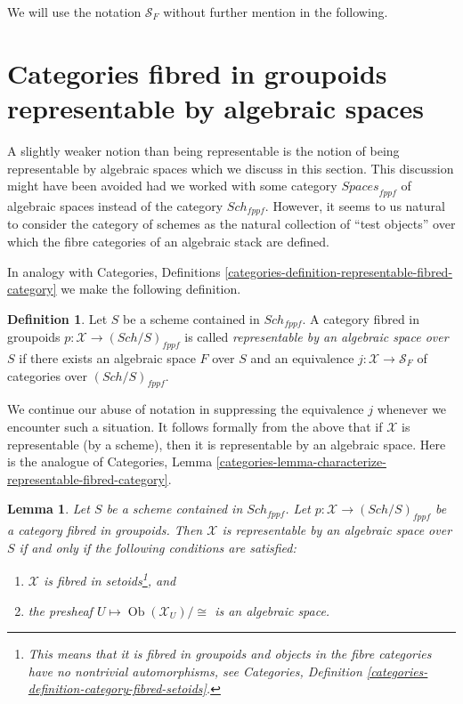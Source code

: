 \documentclass{stacks-project}
\theoremstyle{plain}
\newtheorem{lemma}[subsection]{Lemma}
\theoremstyle{definition}
\newtheorem{definition}[subsection]{Definition}
\theoremstyle{remark}
\numberwithin{equation}{subsection}
\def\Sch{\mathit{Sch}}
\def\Ob{\mathop{\mathrm{Ob}}\nolimits}
\begin{document}
\medskip\noindent
We will use the notation $\mathcal{S}_F$ without further mention in the
following.




\section{Categories fibred in groupoids representable by algebraic spaces}
\label{section-representable-by-algebraic-spaces}

\noindent
A slightly weaker notion than being representable is the notion of
being representable by algebraic spaces which we discuss in this section.
This discussion might have been avoided had we worked with some category
$\textit{Spaces}_{fppf}$ of algebraic spaces instead of the category
$\Sch_{fppf}$. However, it seems to us natural to consider the
category of schemes as the natural collection of ``test objects'' over
which the fibre categories of an algebraic stack are defined.

\medskip\noindent
In analogy with Categories, Definitions
\ref{categories-definition-representable-fibred-category}
we make the following definition.

\begin{definition}
\label{definition-representable-by-algebraic-space}
Let $S$ be a scheme contained in $\Sch_{fppf}$.
A category fibred in groupoids $p : \mathcal{X} \to (\Sch/S)_{fppf}$
is called {\it representable by an algebraic space over $S$}
if there exists an algebraic space $F$ over $S$ and an equivalence
$j : \mathcal{X} \to \mathcal{S}_F$
of categories over $(\Sch/S)_{fppf}$.
\end{definition}

\noindent
We continue our abuse of notation in suppressing the equivalence $j$
whenever we encounter such a situation.
It follows formally from the above that if $\mathcal{X}$ is
representable (by a scheme), then it is representable by an
algebraic space. Here is the analogue of
Categories,
Lemma \ref{categories-lemma-characterize-representable-fibred-category}.

\begin{lemma}
\label{lemma-characterize-representable-by-space}
Let $S$ be a scheme contained in $\Sch_{fppf}$.
Let $p : \mathcal{X} \to (\Sch/S)_{fppf}$
be a category fibred in groupoids.
Then $\mathcal{X}$ is representable by an algebraic space over $S$
if and only if the following conditions are satisfied:
\begin{enumerate}
\item $\mathcal{X}$ is fibred in setoids\footnote{This means that
it is fibred in groupoids and objects in the fibre categories
have no nontrivial automorphisms, see Categories,
Definition \ref{categories-definition-category-fibred-setoids}.}, and
\item the presheaf $U \mapsto \Ob(\mathcal{X}_U)/\!\!\cong$ is
an algebraic space.
\end{enumerate}
\end{lemma}
\end{document}
